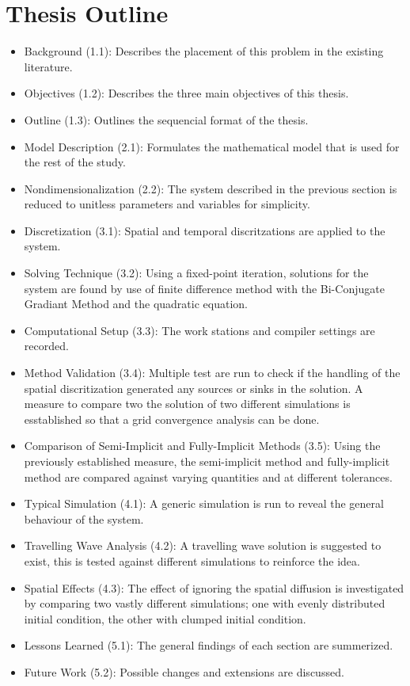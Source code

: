\section{Thesis Outline}

\begin{itemize}
  \item Background (1.1): Describes the placement of this problem in the existing literature.
  \item Objectives (1.2): Describes the three main objectives of this thesis.
  \item Outline (1.3): Outlines the sequencial format of the thesis.
  \item Model Description (2.1): Formulates the mathematical model that is used for the rest of the study.
  \item Nondimensionalization (2.2): The system described in the previous section is reduced to unitless parameters and variables for simplicity.
  \item Discretization (3.1): Spatial and temporal discritzations are applied to the system.
  \item Solving Technique (3.2): Using a fixed-point iteration, solutions for the system are found by use of finite difference method with the Bi-Conjugate Gradiant Method and the quadratic equation.
  \item Computational Setup (3.3): The work stations and compiler settings are recorded.
  \item Method Validation (3.4): Multiple test are run to check if the handling of the spatial discritization generated any sources or sinks in the solution. A measure to compare two the solution of two different simulations is esstablished so that a grid convergence analysis can be done.
  \item Comparison of Semi-Implicit and Fully-Implicit Methods (3.5): Using the previously established measure, the semi-implicit method and fully-implicit method are compared against varying quantities and at different tolerances.
  \item Typical Simulation (4.1): A generic simulation is run to reveal the general behaviour of the system.
  \item Travelling Wave Analysis (4.2): A travelling wave solution is suggested to exist, this is tested against different simulations to reinforce the idea.
  \item Spatial Effects (4.3): The effect of ignoring the spatial diffusion is investigated by comparing two vastly different simulations; one with evenly distributed initial condition, the other with clumped initial condition.
  \item Lessons Learned (5.1): The general findings of each section are summerized.
  \item Future Work (5.2): Possible changes and extensions are discussed.
\end{itemize}

